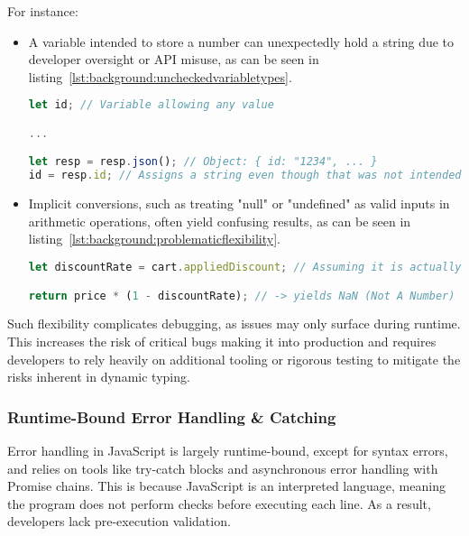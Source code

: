 For instance:

\begin{itemize}
	\item{
		A variable intended to store a number can unexpectedly hold a string due to developer oversight or API misuse, as can be seen in listing~\ref{lst:background:uncheckedvariabletypes}.

		\begin{lstlisting}[language=JavaScript,caption=Unchecked variable assignments due to missing type definitions,label=lst:background:uncheckedvariabletypes]
let id; // Variable allowing any value

...

let resp = resp.json(); // Object: { id: "1234", ... }
id = resp.id; // Assigns a string even though that was not intended
		\end{lstlisting}
	}
	\item{
		Implicit conversions, such as treating "null" or "undefined" as valid inputs in arithmetic operations, often yield confusing results, as can be seen in listing~\ref{lst:background:problematicflexibility}.

		\begin{lstlisting}[language=JavaScript,caption=Broad ability to perform "invalid" operations despite clear error case,label=lst:background:problematicflexibility]
let discountRate = cart.appliedDiscount; // Assuming it is actually "applied_discount" not "appliedDiscount" so it returns "undefined"

return price * (1 - discountRate); // -> yields NaN (Not A Number)
		\end{lstlisting}
	}
\end{itemize}

Such flexibility complicates debugging, as issues may only surface during runtime. This increases the risk of critical bugs making it into production and requires developers to rely heavily on additional tooling or rigorous testing to mitigate the risks inherent in dynamic typing.

\subsubsection{Runtime-Bound Error Handling \& Catching}

Error handling in JavaScript is largely runtime-bound, except for syntax errors, and relies on tools like try-catch blocks and asynchronous error handling with Promise chains. This is because JavaScript is an interpreted language, meaning the program does not perform checks before executing each line. As a result, developers lack pre-execution validation.


